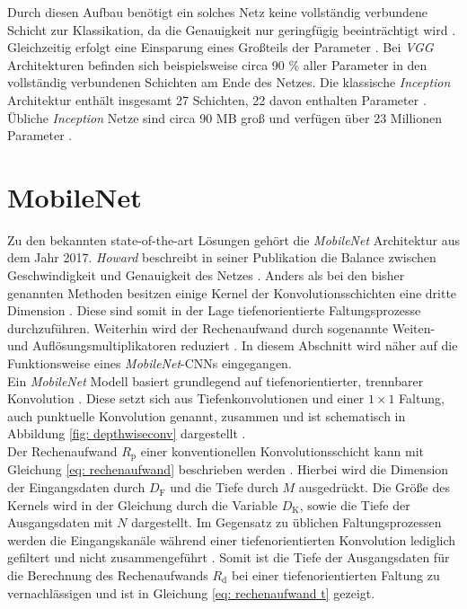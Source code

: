 		Durch diesen Aufbau benötigt ein solches Netz keine vollständig verbundene Schicht zur Klassikation, da die Genauigkeit nur geringfügig beeinträchtigt wird \cite{inception}. Gleichzeitig erfolgt eine Einsparung eines Großteils der Parameter \cite{inception}. Bei \textit{VGG} Architekturen befinden sich beispielsweise circa 90 \% aller Parameter in den vollständig verbundenen Schichten am Ende des Netzes. Die klassische \textit{Inception} Architektur enthält insgesamt 27 Schichten, 22 davon enthalten Parameter \cite{inception}. Übliche \textit{Inception} Netze sind circa 90 MB groß und verfügen über 23 Millionen Parameter \cite{keras}.
		

		
		\section*{MobileNet}
		\label{subsec: mobilenets}
			
			
		Zu den bekannten state-of-the-art Lösungen gehört die \textit{MobileNet} Architektur aus dem Jahr 2017. \textit{Howard} beschreibt in seiner Publikation die Balance zwischen Geschwindigkeit und Genauigkeit des Netzes \cite{mobilenets}. Anders als bei den bisher genannten Methoden besitzen einige Kernel der Konvolutionsschichten eine dritte Dimension \cite{mobilenets}. Diese sind somit in der Lage tiefenorientierte Faltungsprozesse durchzuführen. Weiterhin wird der Rechenaufwand durch sogenannte Weiten- und Auflösungsmultiplikatoren reduziert \cite{mobilenets}. In diesem Abschnitt wird näher auf die Funktionsweise eines \textit{MobileNet}-CNNs eingegangen.\\
		
		
		
	
		Ein \textit{MobileNet} Modell basiert grundlegend auf tiefenorientierter, trennbarer Konvolution \cite{mobilenets}. Diese setzt sich aus Tiefenkonvolutionen und einer $1\times1$ Faltung, auch punktuelle Konvolution genannt, zusammen und ist schematisch in Abbildung \ref{fig: depthwiseconv} dargestellt \cite{mobilenets}.\\
		
	
		
		Der Rechenaufwand $R_\text{p}$ einer konventionellen Konvolutionsschicht kann mit Gleichung \ref{eq: rechenaufwand} beschrieben werden \cite{mobilenets}. Hierbei wird die Dimension der Eingangsdaten durch $D_\text{F}$ und die Tiefe durch $M$ ausgedrückt. Die Größe des Kernels wird in der Gleichung durch die Variable $D_\text{K}$, sowie die Tiefe der Ausgangsdaten mit $N$ dargestellt. Im Gegensatz zu üblichen Faltungsprozessen werden die Eingangskanäle während einer tiefenorientierten Konvolution lediglich gefiltert und nicht zusammengeführt \cite{mobilenets}. Somit ist die Tiefe der Ausgangsdaten für die Berechnung des Rechenaufwands $R_\text{d}$ bei einer tiefenorientierten Faltung zu vernachlässigen und ist in Gleichung \ref{eq: rechenaufwand t} gezeigt. \\
		
